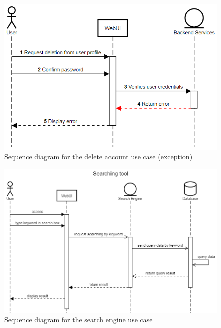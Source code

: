 \documentclass[a4paper]{article}
\begin{document}
\begin{figure}[H]
    \centering
    \includegraphics[width=1.0\textwidth]{delete_account (exception).png}
    \caption{Sequence diagram for the delete account use case (exception)}
    \label{fig:fig19}
\end{figure}

\begin{figure}[H]
    \centering
    \includegraphics[width=1.0\textwidth]{Searching tool.png}
    \caption{Sequence diagram for the search engine use case}
    \label{fig:fig20}
\end{figure}
\end{document}
